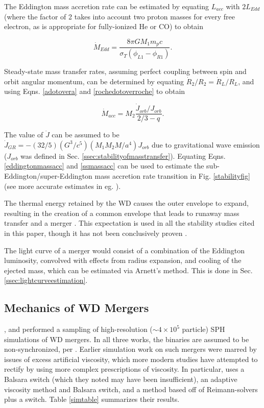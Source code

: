 The Eddington mass accretion rate can be estimated by equating $L_{acc}$ with $2L_{Edd}$ (where the factor of 2 takes into account two proton masses for every free electron, as is appropriate for fully-ionized He or CO) to obtain \cite{marsns04}

\begin{equation}
\dot{M}_{Edd} = \frac{8{\pi}GM_1m_pc}{\sigma_T(\phi_{L1} - \phi_{R1})}.
\label{eddingtonmassacc}
\end{equation}

\noindent Steady-state mass transfer rates, assuming perfect coupling between spin and orbit angular momentum, can be determined by equating $\dot{R}_2/R_2 = \dot{R}_L/R_L$, and using Eqns. \ref{adotovera} and \ref{rochedotoverroche} to obtain

\begin{equation}
\dot{M}_{acc} = M_2\frac{\dot{J}_{orb}/J_{orb}}{2/3 - q}.
\label{ssmassacc}
\end{equation}

\noindent The value of $\dot{J}$ can be assumed to be $\dot{J}_{GR} = -(32/5)(G^3/c^5)(M_1M_2M/a^4)J_{orb}$ due to gravitational wave emission ($J_{orb}$ was defined in Sec. \ref{ssec:stabilityofmasstransfer}).  Equating Eqns. \ref{eddingtonmassacc} and \ref{ssmassacc} can be used to estimate the sub-Eddington/super-Eddington mass accretion rate transition in Fig. \ref{stabilityfig} (see more accurate estimates in eg. \citeauthor{gokhpf07}).

The thermal energy retained by the WD causes the outer envelope to expand, resulting in the creation of a common envelope that leads to runaway mass transfer and a merger \citep{hanw99}.  This expectation is used in all the stability studies cited in this paper, though it has not been conclusively proven \citep{motl+07,marsns04,gokhpf07}.

The light curve of a merger would consist of a combination of the Eddington luminosity, convolved with effects from radius expansion, and cooling of the ejected mass, which can be estimated via Arnett's method.  This is done in Sec. \ref{ssec:lightcurveestimation}.

\subsection{Mechanics of WD Mergers}
\label{ssec:mechanicsofwdmergers}

\cite{guerig04}, \cite{yoonpr07} and \cite{loreig09} performed a sampling of high-resolution ($\sim 4 \times 10^5$ particle) SPH simulations of WD mergers.  In all three works, the binaries are assumed to be non-synchronized, per \citeauthor{segrcm97}.  Earlier simulation work on such mergers were marred by issues of excess artificial viscosity, which more modern studies have attempted to rectify by using more complex prescriptions of viscosity.  In particular, \citeauthor{guerig04} uses a Balsara switch (which they noted may have been insufficient), \citeauthor{yoonpr07} an adaptive viscosity method and Balsara switch, and \citeauthor{loreig09} a method based off of Reimann-solvers plus a switch.  Table \ref{simtable} summarizes their results.

